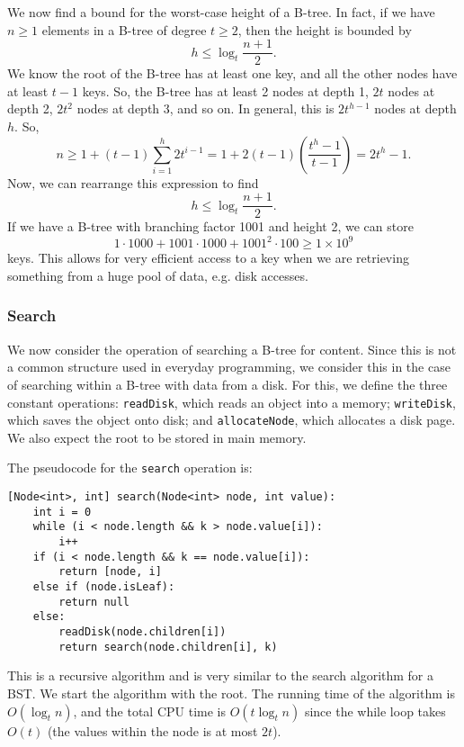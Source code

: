 \documentclass[a4paper, openany]{memoir}
\begin{document}
\noindent We now find a bound for the worst-case height of a B-tree. In fact, if we have $n \geq 1$ elements in a B-tree of degree $t \geq 2$, then the height is bounded by
\[h \leq \log_{t} \frac{n+1}{2}.\]
We know the root of the B-tree has at least one key, and all the other nodes have at least $t - 1$ keys. So, the B-tree has at least 2 nodes at depth 1, $2t$ nodes at depth 2, $2t^2$ nodes at depth 3, and so on. In general, this is $2 t^{h - 1}$ nodes at depth $h$. So,
\[n \geq 1 + (t - 1) \sum_{i = 1}^h 2t^{i - 1} = 1 + 2(t - 1) \left(\frac{t^h - 1}{t - 1}\right) = 2t^h - 1.\]
Now, we can rearrange this expression to find
\[h \leq \log_{t} \frac{n+1}{2}.\]
If we have a B-tree with branching factor 1001 and height 2, we can store
\[1 \cdot 1000 + 1001 \cdot 1000 + 1001^2 \cdot 100 \geq 1 \times 10^9\]
keys. This allows for very efficient access to a key when we are retrieving something from a huge pool of data, e.g. disk accesses.

\subsubsection{Search}
We now consider the operation of searching a B-tree for content. Since this is not a common structure used in everyday programming, we consider this in the case of searching within a B-tree with data from a disk. For this, we define the three constant operations: \texttt{readDisk}, which reads an object into a memory; \texttt{writeDisk}, which saves the object onto disk; and \texttt{allocateNode}, which allocates a disk page. We also expect the root to be stored in main memory.

\noindent The pseudocode for the \texttt{search} operation is:
\begin{lstlisting}[language=pseudocode]
[Node<int>, int] search(Node<int> node, int value):
    int i = 0
    while (i < node.length && k > node.value[i]):
        i++
    if (i < node.length && k == node.value[i]):
        return [node, i]
    else if (node.isLeaf):
        return null
    else:
        readDisk(node.children[i])
        return search(node.children[i], k)
\end{lstlisting}
This is a recursive algorithm and is very similar to the search algorithm for a BST. We start the algorithm with the root. The running time of the algorithm is $O(\log_t n)$, and the total CPU time is $O(t \log_t n)$ since the while loop takes $O(t)$ (the values within the node is at most $2t$).
\end{document}
